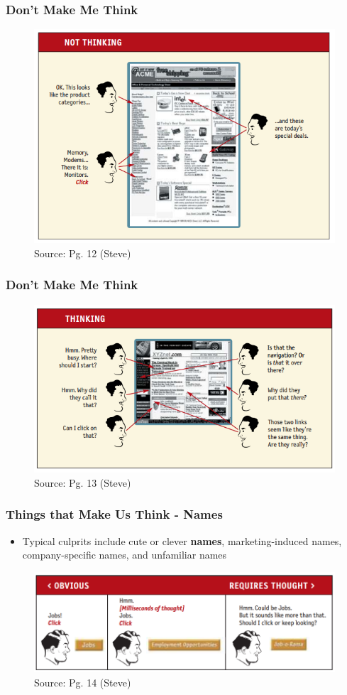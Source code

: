 \documentclass{beamer}
\begin{document}
\begin{frame}
	\frametitle{Don't Make Me Think}
	\centering
	\begin{figure}
		\includegraphics[width=0.7\linewidth]{steve/not-thinking}
		\caption{Source: Pg. 12 (Steve)}
	\end{figure}
\end{frame}

\begin{frame}
	\frametitle{Don't Make Me Think}
	\centering
	\begin{figure}
		\includegraphics[width=0.8\linewidth]{steve/thinking}
		\caption{Source: Pg. 13 (Steve)}
	\end{figure}
\end{frame}

\begin{frame}
	\frametitle{Things that Make Us Think - Names}
	\begin{itemize}
		\item Typical culprits include cute or clever \textbf{names}, marketing-induced names, company-specific names, and unfamiliar names
	\end{itemize}
	\centering
	\begin{figure}
		\includegraphics[width=0.8\linewidth]{steve/names}
		\caption{Source: Pg. 14 (Steve)}
	\end{figure}
\end{frame}
\end{document}
